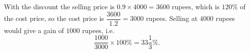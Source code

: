 With the discount the selling price is $0.9\times4000=3600$ rupees, which is $120\%$ of the cost price, so the cost price is $\dfrac{3600}{1.2}=3000$ rupees. Selling at $4000$ rupees would give a gain of $1000$ rupees, i.e.
\[\dfrac{1000}{3000}\times100\%=\boxed{33\dfrac13\%}.\]
